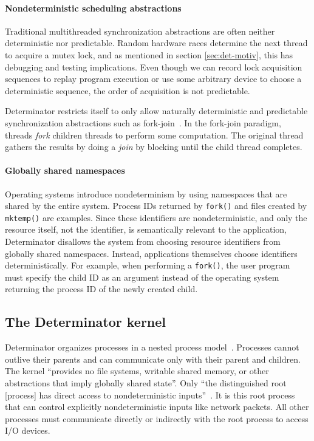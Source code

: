 \paragraph{Nondeterministic scheduling abstractions}
Traditional multithreaded synchronization abstractions are often neither
deterministic nor predictable. Random hardware races determine the next thread
to acquire a mutex lock, and as mentioned in section \ref{sec:det-motiv}, this
has debugging and testing implications. Even though we can record lock
acquisition sequences to replay program execution or use some arbitrary device
to choose a deterministic sequence, the order of acquisition is not predictable.

Determinator restricts itself to only allow naturally deterministic and
predictable synchronization abstractions such as
fork-join~\cite{nelson1988approximate}. In the fork-join paradigm, threads
\emph{fork} children threads to perform some computation. The original thread
gathers the results by doing a \emph{join} by blocking until the child thread
completes.

\paragraph{Globally shared namespaces}
Operating systems introduce nondeterminism by using namespaces that are shared
by the entire system. Process IDs returned by {\tt fork()} and files created
by {\tt mktemp()} are examples. Since these identifiers are nondeterministic,
and only the resource itself, not the identifier, is semantically relevant to
the application, Determinator disallows the system from choosing resource
identifiers from globally shared namespaces. Instead, applications themselves
choose identifiers deterministically. For example, when performing a
{\tt fork()}, the user program must specify the child ID as an argument instead
of the operating system returning the process ID of the newly created child.

\subsection{The Determinator kernel}

Determinator organizes processes in a nested process
model~\cite{Ford96,Aviram10}.
Processes cannot outlive their parents and can communicate only with their
parent and children. The kernel ``provides no file systems, writable shared
memory, or other abstractions that imply globally shared state''. Only ``the
distinguished root [process] has direct access to nondeterministic
inputs''~\cite{Aviram10}. It is this root process that can control explicitly
nondeterministic inputs like network packets. All other processes must
communicate directly or indirectly with the root process to access I/O devices.

